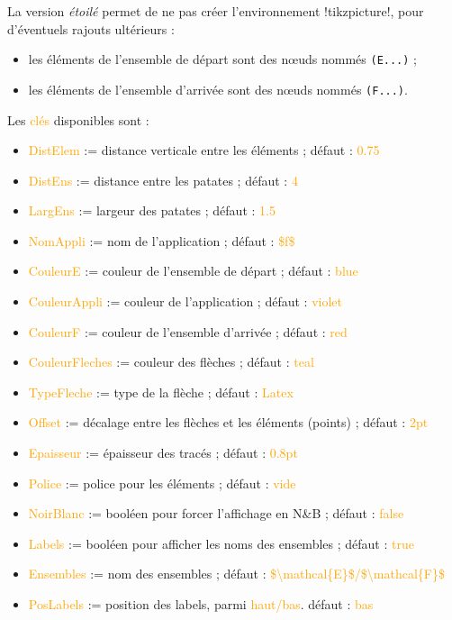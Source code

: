 \documentclass[french,a4paper,11pt]{article}
\newcommand\Cle[1]{{\small\sffamily\textlangle \textcolor{orange}{#1}\textrangle}}
\begin{document}
{{\begin{tipblock}
La version \textit{étoilé} permet de ne pas créer l'environnement \motcletex!tikzpicture!, pour d'éventuels rajouts ultérieurs :

\begin{itemize}
	\item les éléments de l'ensemble de départ sont des nœuds nommés \verb!(E...)! ;
	\item les éléments de l'ensemble d'arrivée sont des nœuds nommés \verb!(F...)!.
\end{itemize}
\vspace*{-\baselineskip}\leavevmode
\end{tipblock}


\begin{tipblock}
Les \Cle{clés} disponibles sont :

\begin{itemize}
	\item \Cle{DistElem} := distance verticale entre les éléments ; \hfill{}défaut : \Cle{0.75}
	\item \Cle{DistEns} := distance entre les \og patates \fg{} ; \hfill{}défaut : \Cle{4}
	\item \Cle{LargEns} := largeur des \og patates \fg{} ; \hfill{}défaut : \Cle{1.5}
	\item \Cle{NomAppli} := nom de l'application ; \hfill{}défaut : \Cle{\$f\$}
	\item \Cle{CouleurE} := couleur de l'ensemble de départ ; \hfill{}défaut : \Cle{blue}
	\item \Cle{CouleurAppli} := couleur de l'application ; \hfill{}défaut : \Cle{violet}
	\item \Cle{CouleurF} := couleur de l'ensemble d'arrivée ; \hfill{}défaut : \Cle{red}
	\item \Cle{CouleurFleches} := couleur des flèches ; \hfill{}défaut : \Cle{teal}
	\item \Cle{TypeFleche} := type de la flèche  ; \hfill{}défaut : \Cle{Latex}
	\item \Cle{Offset} := décalage entre les flèches et les éléments (points) ; \hfill{}défaut : \Cle{2pt}
	\item \Cle{Epaisseur} := épaisseur des tracés ; \hfill{}défaut : \Cle{0.8pt}
	\item \Cle{Police} := police pour les éléments ; \hfill{}défaut : \Cle{vide}
	\item \Cle{NoirBlanc} := booléen pour forcer l'affichage en N\&{}B ; \hfill{}défaut : \Cle{false}
	\item \Cle{Labels} := booléen pour afficher les noms des ensembles ; \hfill{}défaut : \Cle{true}
	\item \Cle{Ensembles} := nom des ensembles  ; \hfill{}défaut : \Cle{\$\textbackslash mathcal\{E\}\$/\$\textbackslash  mathcal\{F\}\$}
	\item \Cle{PosLabels} := position des labels, parmi \Cle{haut/bas}. \hfill{}défaut : \Cle{bas}
\end{itemize}


\end{tipblock}}}
\end{document}
